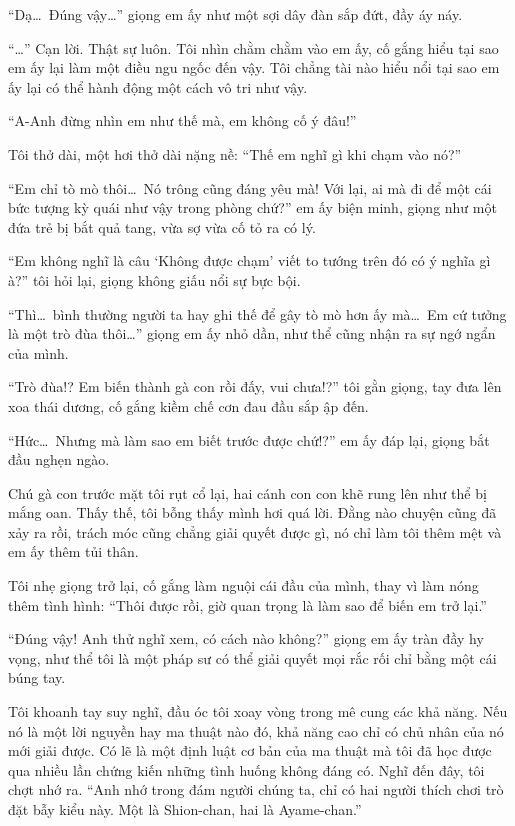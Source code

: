 \documentclass[../main.tex]{subfiles}
\begin{document}
``Dạ\dots\ Đúng vậy\dots'' giọng em ấy như một sợi dây đàn sắp đứt, đầy áy náy.

``\dots'' Cạn lời. Thật sự luôn. Tôi nhìn chằm chằm vào em ấy, cố gắng hiểu tại sao em ấy lại làm một điều ngu ngốc đến vậy. Tôi chẳng tài nào hiểu nổi tại sao em ấy lại có thể hành động một cách vô tri như vậy.

``A-Anh đừng nhìn em như thế mà, em không cố ý đâu!''

Tôi thở dài, một hơi thở dài nặng nề:
``Thế em nghĩ gì khi chạm vào nó?''

``Em chỉ tò mò thôi\dots\ Nó trông cũng đáng yêu mà! Với lại, ai mà đi để một cái bức tượng kỳ quái như vậy trong phòng chứ?'' em ấy biện minh, giọng như một đứa trẻ bị bắt quả tang, vừa sợ vừa cố tỏ ra có lý.

``Em không nghĩ là câu `Không được chạm' viết to tướng trên đó có ý nghĩa gì à?'' tôi hỏi lại, giọng không giấu nổi sự bực bội.

``Thì\dots\ bình thường người ta hay ghi thế để gây tò mò hơn ấy mà\dots\ Em cứ tưởng là một trò đùa thôi\dots'' giọng em ấy nhỏ dần, như thể cũng nhận ra sự ngớ ngẩn của mình.

``Trò đùa!? Em biến thành gà con rồi đấy, vui chưa!?'' tôi gằn giọng, tay đưa lên xoa thái dương, cố gắng kiềm chế cơn đau đầu sắp ập đến.

``Hức\dots\ Nhưng mà làm sao em biết trước được chứ!?'' em ấy đáp lại, giọng bắt đầu nghẹn ngào.

Chú gà con trước mặt tôi rụt cổ lại, hai cánh con con khẽ rung lên như thể bị mắng oan. Thấy thế, tôi bỗng thấy mình hơi quá lời. Đằng nào chuyện cũng đã xảy ra rồi, trách móc cũng chẳng giải quyết được gì, nó chỉ làm tôi thêm mệt và em ấy thêm tủi thân.

Tôi nhẹ giọng trở lại, cố gắng làm nguội cái đầu của mình, thay vì làm nóng thêm tình hình:
``Thôi được rồi, giờ quan trọng là làm sao để biến em trở lại.''

``Đúng vậy! Anh thử nghĩ xem, có cách nào không?'' giọng em ấy tràn đầy hy vọng, như thể tôi là một pháp sư có thể giải quyết mọi rắc rối chỉ bằng một cái búng tay.

Tôi khoanh tay suy nghĩ, đầu óc tôi xoay vòng trong mê cung các khả năng. Nếu nó là một lời nguyền hay ma thuật nào đó, khả năng cao chỉ có chủ nhân của nó mới giải được. Có lẽ là một định luật cơ bản của ma thuật mà tôi đã học được qua nhiều lần chứng kiến những tình huống không đáng có. Nghĩ đến đây, tôi chợt nhớ ra. ``Anh nhớ trong đám người chúng ta, chỉ có hai người thích chơi trò đặt bẫy kiểu này. Một là Shion-chan, hai là Ayame-chan.''
\end{document}
